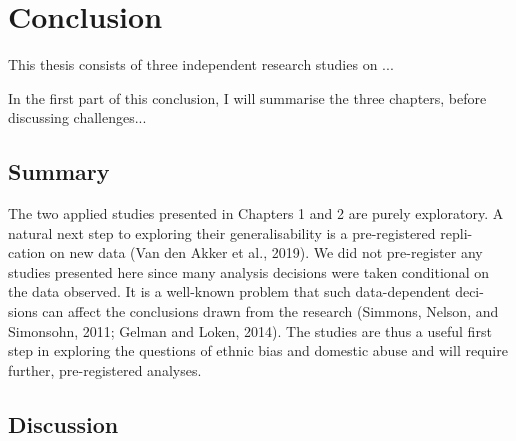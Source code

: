 
\chapter{Conclusion}%
\label{cha:conclusion}


This thesis consists of three independent research studies on ...

In the first part of this conclusion, I will summarise the three chapters,
before discussing challenges...


\section{Summary}%
\label{sec:summary}

The two applied studies presented in Chapters 1 and 2 are purely exploratory.
A natural next step to exploring their generalisability is a pre-registered repli- cation on new data (Van den Akker et al., 2019). We did not pre-register any studies presented here since many analysis decisions were taken conditional on the data observed. It is a well-known problem that such data-dependent deci- sions can affect the conclusions drawn from the research (Simmons, Nelson, and Simonsohn, 2011; Gelman and Loken, 2014). The studies are thus a useful first step in exploring the questions of ethnic bias and domestic abuse and will require further, pre-registered analyses.




\section{Discussion}%
\label{sec:discussion}


